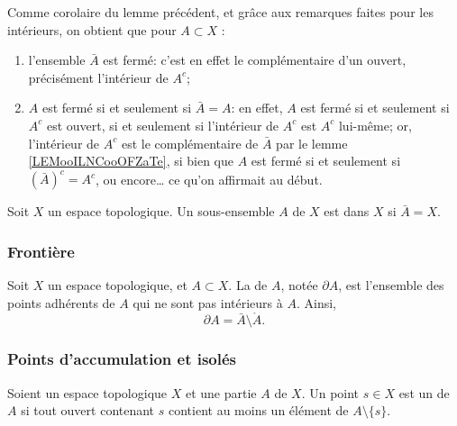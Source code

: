 \begin{remark}\label{RemAdhFerme}
  Comme corolaire du lemme précédent, et grâce aux remarques faites pour les intérieurs, on obtient que pour \( A \subset X \) :
  \begin{enumerate}
  \item l'ensemble \( \bar A \) est fermé: c'est en effet le complémentaire d'un ouvert, précisément l'intérieur de \( A^c \);
  \item \( A \) est fermé si et seulement si \( \bar A = A \): en effet, \( A \) est fermé si et seulement si \( A^c \) est ouvert, si et seulement si l'intérieur de \( A^c \) est \( A^c \) lui-même; or, l'intérieur de \( A^c \) est le complémentaire de \( \bar A \) par le lemme \ref{LEMooILNCooOFZaTe}, si bien que \( A \) est fermé si et seulement si \( (\bar A)^c  = A^c \), ou encore\dots{} ce qu'on affirmait au début.
  \end{enumerate}
\end{remark}

\begin{definition}\label{DefEnsembleDense}
  Soit \( X \) un espace topologique. Un sous-ensemble \( A \) de \( X \) est  dans \( X \) si \( \bar A = X\). 
\end{definition}

\subsubsection{Frontière}

\begin{definition}
  Soit \( X \) un espace topologique, et \( A \subset X \). La  de \( A \), notée \( \partial A \), est l'ensemble des points adhérents de \( A \) qui ne sont pas intérieurs à \( A \). Ainsi,
  \begin{equation}
    \partial A = \bar A \setminus \mathring A.
  \end{equation}
\end{definition}

\subsubsection{Points d'accumulation et isolés}

\begin{definition}      \label{DEFooGHUUooZKTJRi}
    Soient un espace topologique \( X\) et une partie \( A\) de \( X\). Un point \( s\in X \) est un  de \( A\) si tout ouvert contenant \( s\) contient au moins un élément de \( A\setminus\{ s \}\).
\end{definition}

